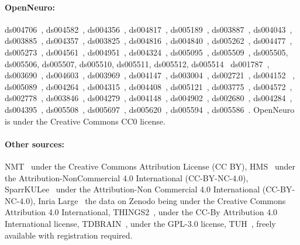 \documentclass{article}
\begin{document}
\paragraph{OpenNeuro:}
ds004706~\citep{ds004706:1.0.0},
ds004582~\citep{ds004582:1.0.0},
ds004356~\citep{ds004356:1.0.0},
ds004817~\citep{ds004817:1.0.1},
ds005189~\citep{ds005189:1.0.1},
ds003887~\citep{ds003887:1.2.3},
ds004043~\citep{ds004043:1.0.0},
ds003885~\citep{ds003885:1.0.0}, 
ds004357~\citep{ds004357:1.0.1}, 
ds003825~\citep{ds003825:1.2.0}, 
ds004816~\citep{ds004816:1.0.1}, 
ds004840~\citep{ds004840:1.0.1}, 
ds005262~\citep{ds005262:1.0.0}, 
ds004477~\citep{ds004477:1.0.0}, 
ds005273~\citep{ds005273:1.0.0}, 
ds004561~\citep{ds004561:1.0.0}, 
ds004951~\citep{ds004951:1.0.0}, 
ds004324~\citep{ds004324:1.0.0}, 
ds005095~\citep{ds005095:1.0.1}, 
ds005509~\citep{ds005509:1.0.1},
ds005505, ds005506, ds005507, ds005510, ds005511, ds005512, ds005514~\citep{shirazi2024hbn,alexander2017open}
ds001787~\citep{ds001787:1.1.1}, 
ds003690~\citep{ds003690:1.0.0},
ds004603~\citep{ds004603:1.1.0},
ds003969~\citep{ds003969:1.0.0},
ds004147~\citep{ds004147:1.0.2},
ds003004~\citep{ds003004:1.1.1},
ds002721~\citep{ds002721:1.0.1},
ds004152~\citep{ds004152:1.1.2} , 
ds005089~\citep{ds005089:1.0.1},
ds004264~\citep{ds004264:1.1.0},
ds004315~\citep{ds004315:1.0.0}, 
ds004408~\citep{ds004408:1.0.0},
ds005121~\citep{ds005121:1.0.1}, 
ds003775~\citep{ds003775:1.2.1}, 
ds004572~\citep{ds004572:1.2.0},
ds002778~\citep{ds002778:1.0.1}, 
ds003846~\citep{ds003846:2.0.2}, 
ds004279~\citep{ds004279:1.1.1},
ds004148~\citep{ds004148:1.0.1},
ds004902~\citep{ds004902:1.0.5}, 
ds002680~\citep{ds002680:1.0.0},
ds004284~\citep{ds004284:1.0.0},
ds004395~\citep{ds004395:2.0.0}, 
\break
ds005508~\citep{ds005508:1.0.0},
ds005697~\citep{ds005697:1.0.0},
ds005620~\citep{ds005620:1.0.0}, 
ds005594~\citep{ds005594:1.0.3}, 
ds005586~\citep{ds005586:2.0.0}. OpenNeuro is under the Creative Commons CC0 license.

\paragraph{Other sources:} NMT~\citep{khan2022nmt} under the Creative Commons Attribution License (CC BY), HMS~\citep{ram2024harmful} under the Attribution-NonCommercial 4.0 International (CC-BY-NC-4.0), SparrKULee~\citep{accou2023sparrkulee} under the Attribution-Non Commercial 4.0 International (CC-BY-NC-4.0), Inria Large~\citep{dreyer2023large} the data on Zenodo being under the Creative Commons Attribution 4.0 International, THINGS2~\citep{gifford2022large}, under the CC-By Attribution 4.0 International license, TDBRAIN~\citep{van2022two}, under the GPL-3.0 license, TUH~\citep{obeid2016temple}, freely available with registration required.
\end{document}

